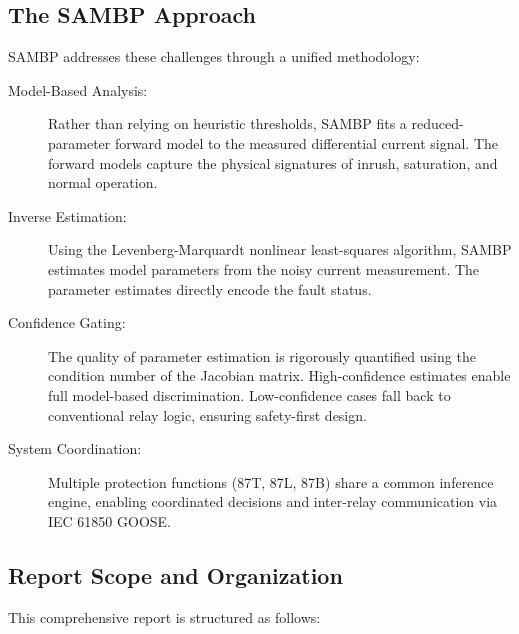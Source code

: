 \documentclass[12pt,a4paper]{article}
\begin{document}
\subsection{The SAMBP Approach}
\label{subsec:sambp_approach}

SAMBP addresses these challenges through a unified methodology:

\begin{description}
    \item[Model-Based Analysis:] Rather than relying on heuristic thresholds, SAMBP 
    fits a reduced-parameter forward model to the measured differential current signal. 
    The forward models capture the physical signatures of inrush, saturation, and normal 
    operation.
    
    \item[Inverse Estimation:] Using the Levenberg-Marquardt nonlinear least-squares 
    algorithm, SAMBP estimates model parameters from the noisy current measurement. 
    The parameter estimates directly encode the fault status.
    
    \item[Confidence Gating:] The quality of parameter estimation is rigorously quantified 
    using the condition number of the Jacobian matrix. High-confidence estimates enable 
    full model-based discrimination. Low-confidence cases fall back to conventional 
    relay logic, ensuring safety-first design.
    
    \item[System Coordination:] Multiple protection functions (87T, 87L, 87B) share a 
    common inference engine, enabling coordinated decisions and inter-relay communication 
    via IEC 61850 GOOSE.
\end{description}

\subsection{Report Scope and Organization}
\label{subsec:scope}

This comprehensive report is structured as follows:
\end{document}
